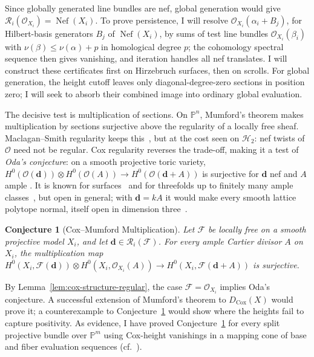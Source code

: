 \documentclass[11pt,reqno]{amsart}
\newtheorem{conjecture}[lemma]{Conjecture}
\theoremstyle{remark}
\newcommand{\Nef}{\operatorname{Nef}}
\newcommand{\Cox}{\operatorname{Cox}}
\newcommand{\dd}{\mathbf{d}}
\newcommand{\PP}{\mathbb{P}}
\newcommand{\cF}{\mathcal{F}}
\newcommand{\cH}{\mathcal{H}}
\newcommand{\cO}{\mathcal{O}}
\newcommand{\cR}{\mathcal{R}}
\begin{document}
Since globally generated line bundles are nef, global generation would give $\cR_i(\cO_{X_i})=\Nef(X_i)$. To prove persistence, I will resolve $\cO_{X_i}(\alpha_i+B_j)$, for Hilbert-basis generators $B_j$ of $\Nef(X_i)$, by sums of test line bundles $\cO_{X_i}(\beta_i)$ with $\nu(\beta)\le\nu(\alpha)+p$ in homological degree $p$; the cohomology spectral sequence then gives vanishing, and iteration handles all nef translates. I will construct these certificates first on Hirzebruch surfaces, then on scrolls. For global generation, the height cutoff leaves only diagonal-degree-zero sections in position zero; I will seek to absorb their combined image into ordinary global evaluation.

The decisive test is multiplication of sections. On $\PP^n$, Mumford's theorem makes multiplication by sections surjective above the regularity of a locally free sheaf. Maclagan--Smith regularity keeps this~\cite{maclaganSmith04}, but at the cost seen on $\cH_2$: nef twists of $\cO$ need not be regular. Cox regularity reverses the trade-off, making it a test of \emph{Oda's conjecture}: on a smooth projective toric variety, $H^0(\cO(\dd))\otimes H^0(\cO(A))\to H^0(\cO(\dd+A))$ is surjective for $\dd$ nef and $A$ ample \cite{oda08}. It is known for surfaces~\cite{fakhruddin03} and for threefolds up to finitely many ample classes~\cite{xin23}, but open in general; with $\dd=kA$ it would make every smooth lattice polytope normal, itself open in dimension three~\cite{BHHHJKM19}.

\begin{conjecture}[Cox--Mumford Multiplication]\label{conj:cox-multiplication}
Let $\cF$ be locally free on a smooth projective model $X_i$, and let $\dd\in\cR_i(\cF)$. For every ample Cartier divisor $A$ on $X_i$, the multiplication map $H^0(X_i,\cF(\dd))\otimes H^0(X_i,\cO_{X_i}(A))\to H^0(X_i,\cF(\dd+A))$ is surjective.
\end{conjecture}

By Lemma~\ref{lem:cox-structure-regular}, the case $\cF=\cO_{X_i}$  implies Oda's conjecture. A successful extension of Mumford's theorem to $D_{\Cox}(X)$ would prove it; a counterexample to Conjecture~\ref{conj:cox-multiplication} would show where the heights fail to capture positivity. As evidence, I have proved Conjecture~\ref{conj:cox-multiplication} for every split projective bundle over $\PP^m$ using Cox-height vanishings in a mapping cone of base and fiber evaluation sequences (cf.~\cite{malaspinaSankaran25}).


\end{document}
